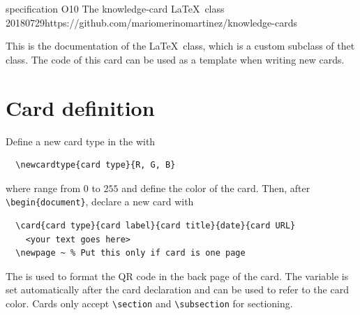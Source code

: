 \documentclass{knowledge-cards}
\begin{document}
  
\card%
{specification}%
{O10}%
{The knowledge-card \LaTeX\ class}%
{20180729}{https://github.com/mariomerinomartinez/knowledge-cards}

This is the documentation of the
 \LaTeX\ class, 
which is a custom subclass of thet  class. The code of this card can be used as a template when writing new cards.

\section{Card definition}
 
Define a new card type in the  
with
%
{ \color{\cardtype}%
\begin{verbatim}
  \newcardtype{card type}{R, G, B}
\end{verbatim}
}%
%
\noindent where  range from $0$ to $255$ and 
define the color of the card.
Then, after {\color{\cardtype} \verb|\begin{document}|}, 
declare a new card with
%
{\color{\cardtype}%
\begin{verbatim}
  \card{card type}{card label}{card title}{date}{card URL}
    <your text goes here> 
  \newpage ~ % Put this only if card is one page
\end{verbatim}
}%
%
\noindent 
The  is used to format the QR code in the back page
of the card.
The variable  is set automatically after the card declaration and can be used
to refer to the card color. 
Cards only accept {\color{\cardtype}\verb|\section|}
and {\color{\cardtype}\verb|\subsection|} for sectioning.
\end{document}
